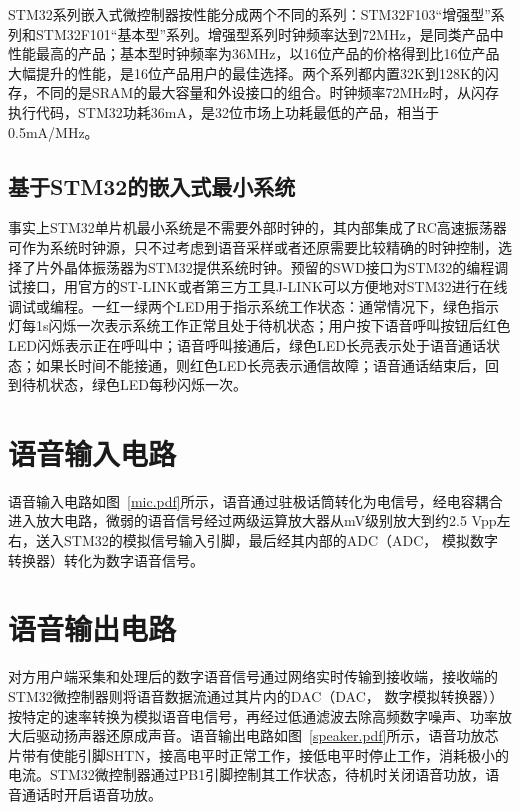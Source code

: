 STM32{\cf}系列{\cf}嵌入{\cf}式微{\cf}控制{\cf}器按{\cf}性能{\cf}分成{\cf}两个{\cf}不同{\cf}的系{\cf}列：{\cf}ST{\cf}M3{\cf}2F{\cf}10{\cf}3“{\cf}增强{\cf}型”{\cf}系列{\cf}和S{\cf}TM{\cf}32{\cf}F1{\cf}01{\cf}“基{\cf}本型{\cf}”系{\cf}列。{\cf}增强{\cf}型系{\cf}列时{\cf}钟频{\cf}率达{\cf}到7{\cf}2M{\cf}Hz{\cf}，是{\cf}同类{\cf}产品{\cf}中性{\cf}能最{\cf}高的{\cf}产品{\cf}；基{\cf}本型{\cf}时钟{\cf}频率{\cf}为3{\cf}6M{\cf}Hz{\cf}，以{\cf}16{\cf}位产{\cf}品的{\cf}价格{\cf}得到{\cf}比1{\cf}6位{\cf}产品{\cf}大幅{\cf}提升{\cf}的性{\cf}能，{\cf}是1{\cf}6位{\cf}产品{\cf}用户{\cf}的最{\cf}佳选{\cf}择。{\cf}两个{\cf}系列{\cf}都内{\cf}置3{\cf}2K{\cf}到1{\cf}28{\cf}K的{\cf}闪存{\cf}，不{\cf}同的{\cf}是S{\cf}RA{\cf}M的{\cf}最大{\cf}容量{\cf}和外{\cf}设接{\cf}口的{\cf}组合{\cf}。时{\cf}钟频{\cf}率7{\cf}2M{\cf}Hz{\cf}时，{\cf}从闪{\cf}存执{\cf}行代{\cf}码，{\cf}ST{\cf}M3{\cf}2功{\cf}耗3{\cf}6m{\cf}A，{\cf}是3{\cf}2位{\cf}市场{\cf}上功{\cf}耗最{\cf}低的{\cf}产品{\cf}，相{\cf}当于{\cf}0.5mA/MHz。

\subsection{基于STM32的嵌入式最小系统}
事实上STM32单片机最小系统是不需要外部时钟的，其内部集成了RC高速振荡器可作为系统时钟源，只不过考虑到语音采样或者还原需要比较精确的时钟控制，选择了片外晶体振荡器为STM32提供系统时钟。预留的SWD接口为STM32的编程调试接口，用官方的ST-LINK或者第三方工具J-LINK可以方便地对STM32进行在线调试或编程。一红一绿两个LED用于指示系统工作状态：通常情况下，绿色指示灯每1s闪烁一次表示系统工作正常且处于待机状态；用户按下语音呼叫按钮后红色LED闪烁表示正在呼叫中；语音呼叫接通后，绿色LED长亮表示处于语音通话状态；如果长时间不能接通，则红色LED长亮表示通信故障；语音通话结束后，回到待机状态，绿色LED每秒闪烁一次。

\section{语音输入电路}
语音输入电路如图~\ref{mic.pdf}所示，语音通过驻极话筒转化为电信号，经电容耦合进入放大电路，微弱的语音信号经过两级运算放大器从mV级别放大到约2.5 Vpp左右，送入STM32的模拟信号输入引脚，最后经其内部的ADC（\acrlong{ADC}， 模拟数字转换器）转化为数字语音信号。

\section{语音输出电路}
对方用户端采集和处理后的数字语音信号通过网络实时传输到接收端，接收端的STM32微控制器则将语音数据流通过其片内的DAC（\acrlong{DAC}， 数字模拟转换器））按特定的速率转换为模拟语音电信号，再经过低通滤波去除高频数字噪声、功率放大后驱动扬声器还原成声音。语音输出电路如图~\ref{speaker.pdf}所示，语音功放芯片带有使能引脚SHTN，接高电平时正常工作，接低电平时停止工作，消耗极小的电流。STM32微控制器通过PB1引脚控制其工作状态，待机时关闭语音功放，语音通话时开启语音功放。

